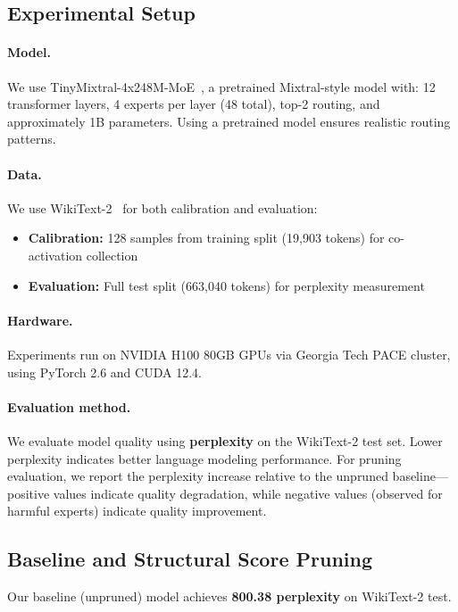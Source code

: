 \documentclass{article}
\begin{document}
\subsection{Experimental Setup}

\paragraph{Model.}
We use TinyMixtral-4x248M-MoE~\citep{tinymixtralhf}, a pretrained Mixtral-style model with:
12 transformer layers, 4 experts per layer (48 total), top-2 routing, and
approximately 1B parameters.
Using a pretrained model ensures realistic routing patterns.

\paragraph{Data.}
We use WikiText-2~\citep{merity2017pointer} for both calibration and evaluation:
\begin{itemize}
    \item \textbf{Calibration:} 128 samples from training split (19,903 tokens) for co-activation collection
    \item \textbf{Evaluation:} Full test split (663,040 tokens) for perplexity measurement
\end{itemize}

\paragraph{Hardware.}
Experiments run on NVIDIA H100 80GB GPUs via Georgia Tech PACE cluster, using
PyTorch 2.6 and CUDA 12.4.

\paragraph{Evaluation method.}
We evaluate model quality using \textbf{perplexity} on the WikiText-2 test set.
Lower perplexity indicates better language modeling performance.
For pruning evaluation, we report the perplexity increase relative to the unpruned
baseline---positive values indicate quality degradation, while negative values
(observed for harmful experts) indicate quality improvement.

\subsection{Baseline and Structural Score Pruning}

Our baseline (unpruned) model achieves \textbf{800.38 perplexity} on WikiText-2 test.
\end{document}
